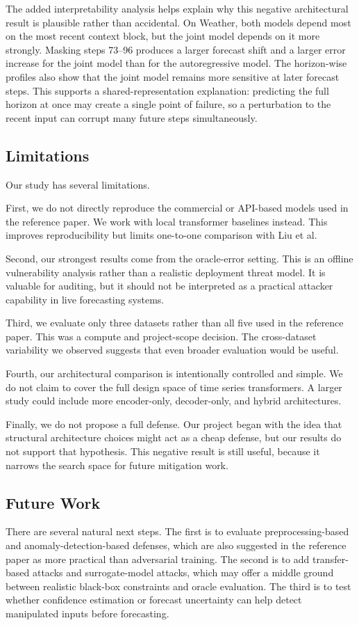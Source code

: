 \documentclass[11pt]{article}
\begin{document}
The added interpretability analysis helps explain why this negative architectural result is plausible rather than accidental. On Weather, both models depend most on the most recent context block, but the joint model depends on it more strongly. Masking steps 73--96 produces a larger forecast shift and a larger error increase for the joint model than for the autoregressive model. The horizon-wise profiles also show that the joint model remains more sensitive at later forecast steps. This supports a shared-representation explanation: predicting the full horizon at once may create a single point of failure, so a perturbation to the recent input can corrupt many future steps simultaneously.

\subsection{Limitations}
Our study has several limitations.

First, we do not directly reproduce the commercial or API-based models used in the reference paper. We work with local transformer baselines instead. This improves reproducibility but limits one-to-one comparison with Liu et al.

Second, our strongest results come from the oracle-error setting. This is an offline vulnerability analysis rather than a realistic deployment threat model. It is valuable for auditing, but it should not be interpreted as a practical attacker capability in live forecasting systems.

Third, we evaluate only three datasets rather than all five used in the reference paper. This was a compute and project-scope decision. The cross-dataset variability we observed suggests that even broader evaluation would be useful.

Fourth, our architectural comparison is intentionally controlled and simple. We do not claim to cover the full design space of time series transformers. A larger study could include more encoder-only, decoder-only, and hybrid architectures.

Finally, we do not propose a full defense. Our project began with the idea that structural architecture choices might act as a cheap defense, but our results do not support that hypothesis. This negative result is still useful, because it narrows the search space for future mitigation work.

\subsection{Future Work}
There are several natural next steps. The first is to evaluate preprocessing-based and anomaly-detection-based defenses, which are also suggested in the reference paper as more practical than adversarial training. The second is to add transfer-based attacks and surrogate-model attacks, which may offer a middle ground between realistic black-box constraints and oracle evaluation. The third is to test whether confidence estimation or forecast uncertainty can help detect manipulated inputs before forecasting.
\end{document}
